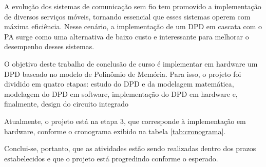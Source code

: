 A evolução dos sistemas de comunicação sem fio tem promovido a implementação de diversos serviços móveis, tornando essencial que esses sistemas operem com máxima eficiência. Nesse cenário, a implementação de um DPD em cascata com o PA surge como uma alternativa de baixo custo e interessante para melhorar o desempenho desses sistemas.

O objetivo deste trabalho de conclusão de curso é implementar em hardware um DPD baseado no modelo de Polinômio de Memória. Para isso, o projeto foi dividido em quatro etapas: estudo do DPD e da modelagem matemática, modelagem do DPD em software, implementação do DPD em hardware e, finalmente, design do circuito integrado

Atualmente, o projeto está na etapa 3, que corresponde à implementação em hardware, conforme o cronograma exibido na tabela \ref{tab:cronograma}. 

Conclui-se, portanto, que as atividades estão sendo realizadas dentro dos prazos estabelecidos e que o projeto está progredindo conforme o esperado.

